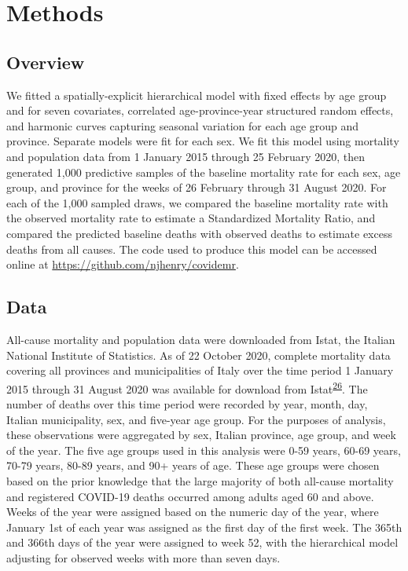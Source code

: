 \documentclass[
]{article}
\begin{document}
\hypertarget{methods}{%
\section{Methods}\label{methods}}

\hypertarget{overview}{%
\subsection{Overview}\label{overview}}

We fitted a spatially-explicit hierarchical model with fixed effects by age group and for seven covariates, correlated age-province-year structured random effects, and harmonic curves capturing seasonal variation for each age group and province. Separate models were fit for each sex. We fit this model using mortality and population data from 1 January 2015 through 25 February 2020, then generated 1,000 predictive samples of the baseline mortality rate for each sex, age group, and province for the weeks of 26 February through 31 August 2020. For each of the 1,000 sampled draws, we compared the baseline mortality rate with the observed mortality rate to estimate a Standardized Mortality Ratio, and compared the predicted baseline deaths with observed deaths to estimate excess deaths from all causes. The code used to produce this model can be accessed online at \url{https://github.com/njhenry/covidemr}.

\hypertarget{data}{%
\subsection{Data}\label{data}}

All-cause mortality and population data were downloaded from Istat, the Italian National Institute of Statistics. As of 22 October 2020, complete mortality data covering all provinces and municipalities of Italy over the time period 1 January 2015 through 31 August 2020 was available for download from Istat\textsuperscript{\protect\hyperlink{ref-ItalianNationalInstituteofStatisticsIstat2020a}{26}}⁠. The number of deaths over this time period were recorded by year, month, day, Italian municipality, sex, and five-year age group. For the purposes of analysis, these observations were aggregated by sex, Italian province, age group, and week of the year. The five age groups used in this analysis were 0-59 years, 60-69 years, 70-79 years, 80-89 years, and 90+ years of age. These age groups were chosen based on the prior knowledge that the large majority of both all-cause mortality and registered COVID-19 deaths occurred among adults aged 60 and above. Weeks of the year were assigned based on the numeric day of the year, where January 1st of each year was assigned as the first day of the first week. The 365th and 366th days of the year were assigned to week 52, with the hierarchical model adjusting for observed weeks with more than seven days.
\end{document}
